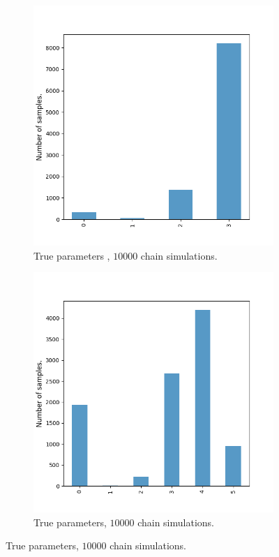 \begin{figure}[H]
    \centering
    \begin{subfigure}{0.48\textwidth}
        \centering
        \includegraphics[width=\linewidth]{figures/bee_3_data.png}
        \caption{True parameters , $10000$ chain simulations.}
    \end{subfigure}
    \hfill
    \begin{subfigure}{0.48\textwidth}
        \centering
        \includegraphics[width=\linewidth]{figures/bee_5_data.png}
        \caption{True parameters, $10000$ chain simulations.}
    \end{subfigure}
\end{figure}

